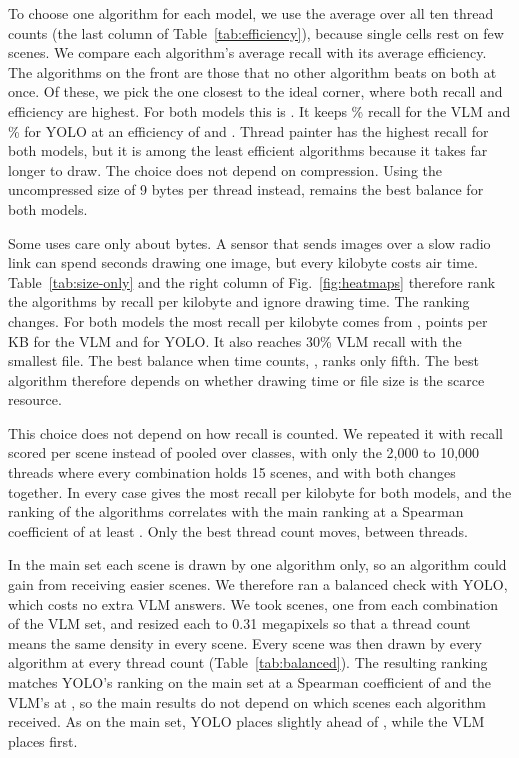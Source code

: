\documentclass[conference]{IEEEtran}
\providecommand{\VlmParetoName}{}\providecommand{\YoloParetoName}{}
\providecommand{\VlmParetoRecall}{}\providecommand{\YoloParetoRecall}{}
\providecommand{\VlmParetoEff}{}\providecommand{\YoloParetoEff}{}
\providecommand{\SizeOnlyBest}{}\providecommand{\SizeOnlyBestVlm}{}\providecommand{\SizeOnlyBestYolo}{}\providecommand{\SizeOnlyVlmY}{0}\providecommand{\SizeOnlyYoloY}{0}
\providecommand{\RobustMinRho}{}\providecommand{\RobustSameBest}{}\providecommand{\RobustCarries}{}
\providecommand{\BalScenes}{}\providecommand{\BalRhoYolo}{}\providecommand{\BalRhoVlm}{}\providecommand{\BalTop}{}\providecommand{\BalBase}{}\providecommand{\BalSecond}{}
\begin{document}

To choose one algorithm for each model, we use the average over all ten thread counts (the last column of Table~\ref{tab:efficiency}), because single cells rest on few scenes. We compare each algorithm's average recall with its average efficiency. The algorithms on the front are those that no other algorithm beats on both at once. Of these, we pick the one closest to the ideal corner, where both recall and efficiency are highest. For both models this is \VlmParetoName{}. It keeps \VlmParetoRecall\% recall for the VLM and \YoloParetoRecall\% for YOLO at an efficiency of \VlmParetoEff{} and \YoloParetoEff{}. Thread painter has the highest recall for both models, but it is among the least efficient algorithms because it takes far longer to draw. The choice does not depend on compression. Using the uncompressed size of 9 bytes per thread instead, \VlmParetoName{} remains the best balance for both models.

Some uses care only about bytes. A sensor that sends images over a slow radio link can spend seconds drawing one image, but every kilobyte costs air time. Table~\ref{tab:size-only} and the right column of Fig.~\ref{fig:heatmaps} therefore rank the algorithms by recall per kilobyte and ignore drawing time. The ranking changes. For both models the most recall per kilobyte comes from \SizeOnlyBest{}, \SizeOnlyBestVlm{} points per KB for the VLM and \SizeOnlyBestYolo{} for YOLO. It also reaches 30\% VLM recall with the smallest file. The best balance when time counts, \VlmParetoName{}, ranks only fifth. The best algorithm therefore depends on whether drawing time or file size is the scarce resource.

This choice does not depend on how recall is counted. We repeated it with recall scored per scene instead of pooled over classes, with only the 2,000 to 10,000 threads where every combination holds 15 scenes, and with both changes together. In every case \SizeOnlyBest{} gives the most recall per kilobyte for both models, and the ranking of the algorithms correlates with the main ranking at a Spearman coefficient of at least \RobustMinRho{}. Only the best thread count moves, between \RobustCarries{} threads.

In the main set each scene is drawn by one algorithm only, so an algorithm could gain from receiving easier scenes. We therefore ran a balanced check with YOLO, which costs no extra VLM answers. We took \BalScenes{} scenes, one from each combination of the VLM set, and resized each to 0.31 megapixels so that a thread count means the same density in every scene. Every scene was then drawn by every algorithm at every thread count (Table~\ref{tab:balanced}). The resulting ranking matches YOLO's ranking on the main set at a Spearman coefficient of \BalRhoYolo{} and the VLM's at \BalRhoVlm{}, so the main results do not depend on which scenes each algorithm received. As on the main set, YOLO places \BalTop{} slightly ahead of \BalSecond{}, while the VLM places \BalSecond{} first.
\end{document}
